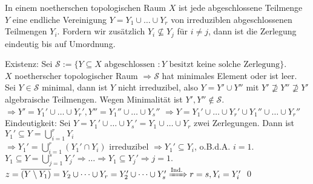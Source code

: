 \begin{satz}
	In einem noetherschen topologischen Raum $X$ ist jede abgeschlossene Teilmenge $Y$ eine endliche Vereinigung $Y = Y_1 \cup \dots \cup Y_r$ von irreduziblen abgeschlossenen Teilmengen $Y_i$. Fordern wir zusätzlich $Y_i \nsubseteq Y_j$ für $i \neq j$, dann ist die Zerlegung eindeutig bis auf Umordnung.
\end{satz}

	Existenz: Sei $\mathcal{S} := \{Y \subseteq X \text{ abgeschlossen } : Y \text{ besitzt keine solche Zerlegung} \}$. \\
	$X$ noetherscher topologischer Raum $\Rightarrow \mathcal{S}$ hat minimales Element oder ist leer. Sei $Y \in \mathcal{S}$ minimal, dann ist $Y$ nicht irreduzibel, also $Y = Y' \cup Y''$ mit $Y' \nsupseteq Y'' \nsupseteq Y'$ algebraische Teilmengen. Wegen Minimalität ist $Y', Y'' \notin \mathcal{S}$. \\
	$\Rightarrow Y' = Y_1' \cup \dots \cup Y_r', Y'' = Y_1'' \cup \dots \cup Y_s''$ 
	$\Rightarrow Y = Y_1' \cup \dots \cup Y_r' \cup Y_1'' \cup \dots \cup Y_r''$ \\
	
	Eindeutigkeit: Sei $Y = Y_1' \cup \dots \cup Y_s' = Y_1 \cup \dots \cup Y_r$ zwei Zerlegungen. Dann ist $Y_1' \subseteq Y = \bigcup_{i=1}^r Y_i$ \\
	$\Rightarrow Y_1' = \bigcup_{i=1}^r (Y_1' \cap Y_i)$ irreduzibel $\Rightarrow Y_1' \subseteq Y_i$, o.B.d.A. $i=1$. $Y_1 \subseteq Y = \bigcup_{j=1}^s Y_j' \Rightarrow \dots \Rightarrow Y_1 \subseteq Y_j' \Rightarrow j=1.$ \\
	$z = \overline{(Y \setminus Y_1)} = Y_2 \cup \dots \cup Y_r = Y_2' \cup \dots \cup Y_s' \xRightarrow{\text{Ind.}} r=s, Y_i = Y_i'$ \qed